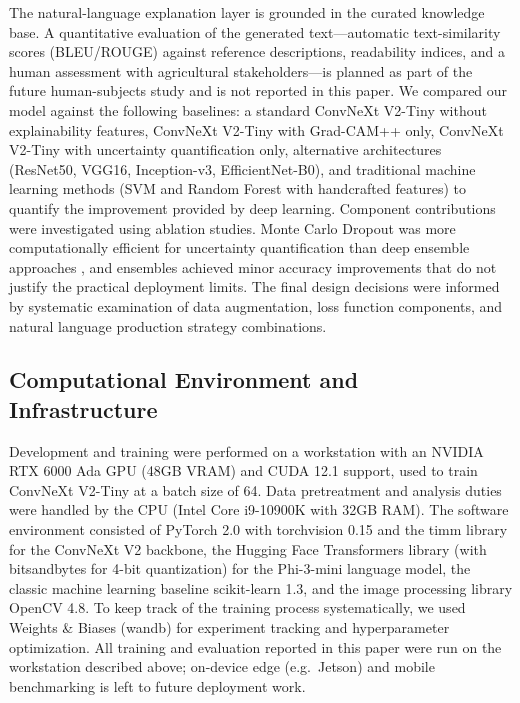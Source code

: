 \documentclass[pdflatex,sn-mathphys-num]{sn-jnl}%
\begin{document}
The natural-language explanation layer is grounded in the curated knowledge base. A quantitative evaluation of the generated text---automatic text-similarity scores (BLEU/ROUGE) against reference descriptions, readability indices, and a human assessment with agricultural stakeholders---is planned as part of the future human-subjects study and is not reported in this paper.
We compared our model against the following baselines: a standard ConvNeXt V2-Tiny without explainability features, ConvNeXt V2-Tiny with Grad-CAM++ only, ConvNeXt V2-Tiny with uncertainty quantification only, alternative architectures (ResNet50, VGG16, Inception-v3, EfficientNet-B0), and traditional machine learning methods (SVM and Random Forest with handcrafted features) to quantify the improvement provided by deep learning. Component contributions were investigated using ablation studies. Monte Carlo Dropout was more computationally efficient for uncertainty quantification than deep ensemble approaches \cite{lakshminarayanan2017ensembles}, and ensembles achieved minor accuracy improvements that do not justify the practical deployment limits. The final design decisions were informed by systematic examination of data augmentation, loss function components, and natural language production strategy combinations.


\subsection{Computational Environment and Infrastructure}\label{subsec:computation}

Development and training were performed on a workstation with an NVIDIA RTX 6000 Ada GPU (48GB VRAM) and CUDA 12.1 support, used to train ConvNeXt V2-Tiny at a batch size of 64. Data pretreatment and analysis duties were handled by the CPU (Intel Core i9-10900K with 32GB RAM). The software environment consisted of PyTorch 2.0 with torchvision 0.15 and the timm library for the ConvNeXt V2 backbone, the Hugging Face Transformers library (with bitsandbytes for 4-bit quantization) for the Phi-3-mini language model, the classic machine learning baseline scikit-learn 1.3, and the image processing library OpenCV 4.8. To keep track of the training process systematically, we used Weights \& Biases (wandb) for experiment tracking and hyperparameter optimization. All training and evaluation reported in this paper were run on the workstation described above; on-device edge (e.g.\ Jetson) and mobile benchmarking is left to future deployment work.
\end{document}
